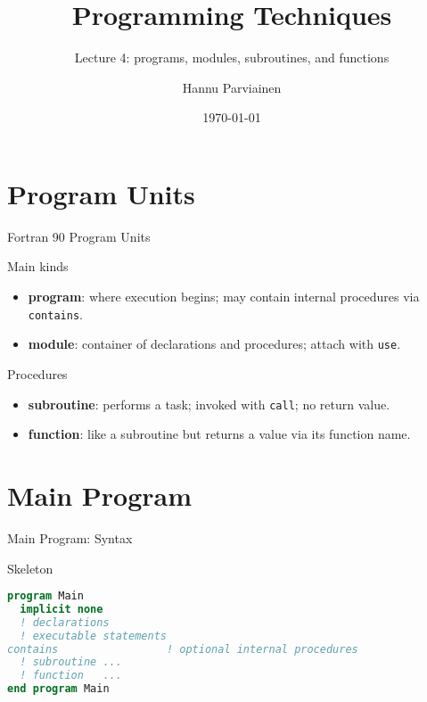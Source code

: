 
\title{Programming Techniques}
\subtitle{Lecture 4: programs, modules, subroutines, and functions}
\author{Hannu Parviainen}
\date{\today}



\begin{frame}
  \titlepage
\end{frame}

\section{Program Units}

\begin{frame}{Fortran 90 Program Units}
  \begin{block}{Main kinds}
    \begin{itemize}
      \item \textbf{program}: where execution begins; may contain internal procedures via \texttt{contains}.
      \item \textbf{module}: container of declarations and procedures; attach with \texttt{use}.
    \end{itemize}
  \end{block}
  \begin{block}{Procedures}
    \begin{itemize}
      \item \textbf{subroutine}: performs a task; invoked with \texttt{call}; no return value.
      \item \textbf{function}: like a subroutine but returns a value via its function name.
    \end{itemize}
  \end{block}
\end{frame}

\section{Main Program}

\begin{frame}[fragile]{Main Program: Syntax}
\begin{block}{Skeleton}
\begin{lstlisting}[language=Fortran]
program Main
  implicit none
  ! declarations
  ! executable statements
contains                 ! optional internal procedures
  ! subroutine ...
  ! function   ...
end program Main
\end{lstlisting}
\end{block}
\end{frame}

